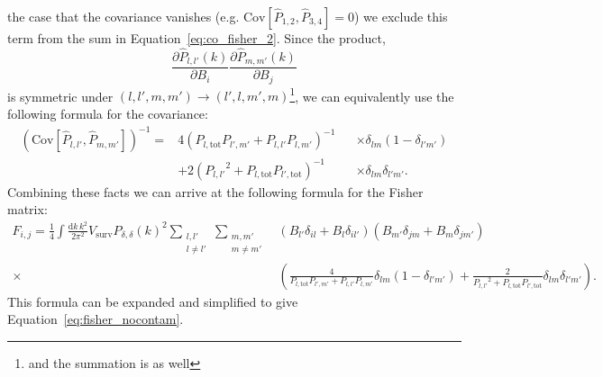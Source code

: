 \documentclass{aastex62}
\newcommand{\beq}{\begin{equation}}
\newcommand{\eeq}{\end{equation}}
\newcommand{\denps}{\ensuremath{P_{\delta,\delta}}}
\newcommand{\xps}[2]{\ensuremath{P_{#1,#2}}}
\newcommand{\pstot}[1]{\ensuremath{P_{#1,\text{tot}}}}
\newcommand{\Cov}[2]{\mathrm{Cov}[#1,#2]}
\begin{document}
the case that the covariance vanishes (e.g.
$\Cov{\hat{P}_{1,2}}{\hat{P}_{3,4}}=0$) we exclude this term from the sum in
Equation~\ref{eq:co_fisher_2}. Since the product,
\begin{equation*}
\frac{\partial \hat{P}_{l,l'}(k)}{\partial B_i}
\frac{\partial \hat{P}_{m,m'}(k)}{\partial B_j}
\end{equation*}
is symmetric under $(l,l',m,m') \rightarrow (l',l,m',m)$\footnote{and the
summation is as well}, we can equivalently use the following formula for the
covariance:
\beq\label{eq:cov_simple}
\begin{aligned}
\left(\Cov{\hat{P}_{l,l'}}{\hat{P}_{m,m'}}\right)^{-1} = 
&4 (\pstot{l}\xps{l'}{m'} + \xps{l}{l'}\xps{l}{m'})^{-1} &&\times \delta_{lm} (1-\delta_{l'm'}) \\
&+ 2(\xps{l}{l'}^2 + \pstot{l}\pstot{l'})^{-1} &&\times \delta_{lm} \delta_{l'm'}\text{.}
\end{aligned}
\eeq
Combining these facts we can arrive at the following formula for the Fisher matrix:
\beq\label{eq:co_fisher_explicity}
\begin{split}
F_{i,j} = 
\frac{1}{4} \int \frac{\text{d}k\,k^2}{2\pi^2} V_{\text{surv}} 
\denps(k)^2
\sum_{\substack{l,l'\\l \neq l'}} \sum_{\substack{m,m'\\m \neq m'}}
&\left( B_{l'} \delta_{il} + B_l\delta_{il'} \right)
\left( B_{m'} \delta_{jm} + B_m\delta_{jm'} \right) \\
\times&\left( \frac{4}{\pstot{l}\xps{l'}{m'} + \xps{l}{l'}\xps{l}{m'}} \delta_{lm} (1-\delta_{l'm'})
+ \frac{2}{\xps{l}{l'}^2 + \pstot{l}\pstot{l'}} \delta_{lm} \delta_{l'm'}\right)
\text{.}
\end{split}
\eeq
This formula can be expanded and simplified to give Equation~\ref{eq:fisher_nocontam}.


\end{document}
